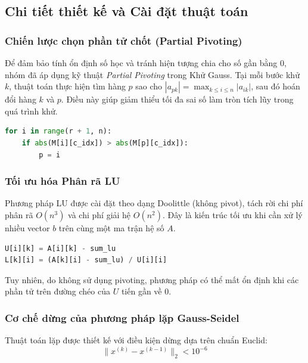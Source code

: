 \documentclass[a4paper]{article}
\begin{document}
\subsection{Chi tiết thiết kế và Cài đặt thuật toán}

\subsubsection{Chiến lược chọn phần tử chốt (Partial Pivoting)}
Để đảm bảo tính ổn định số học và tránh hiện tượng chia cho số gần bằng $0$, nhóm đã áp dụng kỹ thuật \textit{Partial Pivoting} trong Khử Gauss. Tại mỗi bước khử $k$, thuật toán thực hiện tìm hàng $p$ sao cho $|a_{pk}| = \max_{k \le i \le n} |a_{ik}|$, sau đó hoán đổi hàng $k$ và $p$. Điều này giúp giảm thiểu tối đa sai số làm tròn tích lũy trong quá trình khử.


\begin{lstlisting}[language=Python, style=pythonstyle, caption={Chọn pivot lớn nhất theo trị tuyệt đối}]
for i in range(r + 1, n):
    if abs(M[i][c_idx]) > abs(M[p][c_idx]):
        p = i
\end{lstlisting}



\subsubsection{Tối ưu hóa Phân rã LU}
Phương pháp LU được cài đặt theo dạng Doolittle (không pivot), tách rời chi phí phân rã $O(n^3)$ và chi phí giải hệ $O(n^2)$. Đây là kiến trúc tối ưu khi cần xử lý nhiều vector $b$ trên cùng một ma trận hệ số $A$.


\begin{lstlisting}[language=Python, style=pythonstyle, caption={Cập nhật ma trận L và U}]
U[i][k] = A[i][k] - sum_lu
L[k][i] = (A[k][i] - sum_lu) / U[i][i]
\end{lstlisting}

Tuy nhiên, do không sử dụng pivoting, phương pháp có thể mất ổn định khi các phần tử trên đường chéo của $U$ tiến gần về $0$.

\subsubsection{Cơ chế dừng của phương pháp lặp Gauss-Seidel}
Thuật toán lặp được thiết kế với điều kiện dừng dựa trên chuẩn Euclid:
\begin{equation}
    \|x^{(k)} - x^{(k-1)}\|_2 < 10^{-6}
\end{equation}
\end{document}
